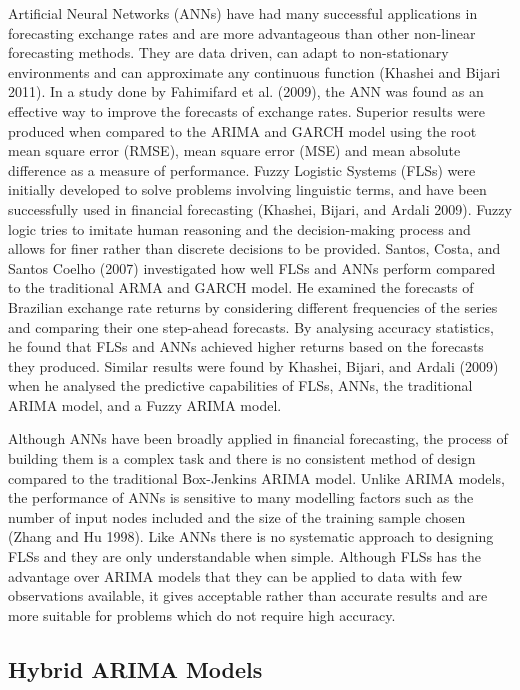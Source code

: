 \documentclass[12pt,a4paper]{article}
\numberwithin{equation}{section}
\numberwithin{figure}{section}
\numberwithin{table}{section}
\begin{document}
Artificial Neural Networks (ANNs) have had many successful applications
in forecasting exchange rates and are more advantageous than other
non-linear forecasting methods. They are data driven, can adapt to
non-stationary environments and can approximate any continuous function
(Khashei and Bijari 2011). In a study done by Fahimifard et al. (2009),
the ANN was found as an effective way to improve the forecasts of
exchange rates. Superior results were produced when compared to the
ARIMA and GARCH model using the root mean square error (RMSE), mean
square error (MSE) and mean absolute difference as a measure of
performance. Fuzzy Logistic Systems (FLSs) were initially developed to
solve problems involving linguistic terms, and have been successfully
used in financial forecasting (Khashei, Bijari, and Ardali 2009). Fuzzy
logic tries to imitate human reasoning and the decision-making process
and allows for finer rather than discrete decisions to be provided.
Santos, Costa, and Santos Coelho (2007) investigated how well FLSs and
ANNs perform compared to the traditional ARMA and GARCH model. He
examined the forecasts of Brazilian exchange rate returns by considering
different frequencies of the series and comparing their one step-ahead
forecasts. By analysing accuracy statistics, he found that FLSs and ANNs
achieved higher returns based on the forecasts they produced. Similar
results were found by Khashei, Bijari, and Ardali (2009) when he
analysed the predictive capabilities of FLSs, ANNs, the traditional
ARIMA model, and a Fuzzy ARIMA model.

Although ANNs have been broadly applied in financial forecasting, the
process of building them is a complex task and there is no consistent
method of design compared to the traditional Box-Jenkins ARIMA model.
Unlike ARIMA models, the performance of ANNs is sensitive to many
modelling factors such as the number of input nodes included and the
size of the training sample chosen (Zhang and Hu 1998). Like ANNs there
is no systematic approach to designing FLSs and they are only
understandable when simple. Although FLSs has the advantage over ARIMA
models that they can be applied to data with few observations available,
it gives acceptable rather than accurate results and are more suitable
for problems which do not require high accuracy.

\subsection{Hybrid ARIMA Models}\label{hybrid-arima-models}
\end{document}
